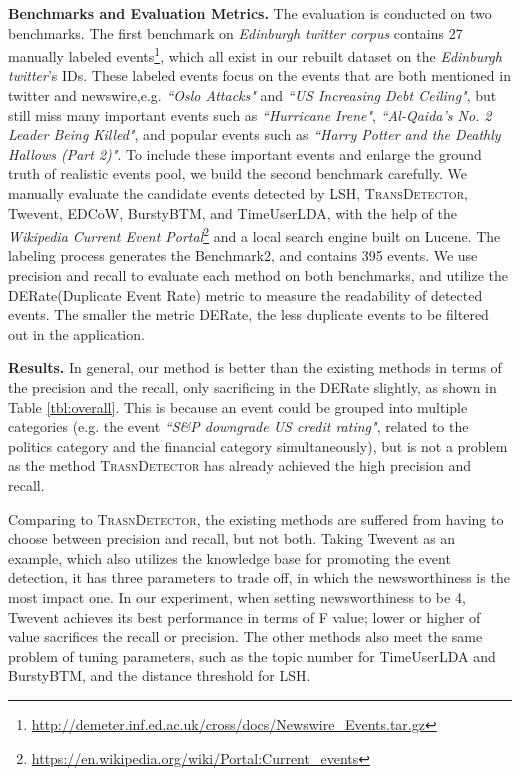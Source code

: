 \documentclass[runningheads,a4paper]{llncs}
\theoremstyle{exampstyle}
\begin{document}
\textbf{Benchmarks and Evaluation Metrics.} 
The evaluation is conducted on two benchmarks.
The first benchmark on \textit{Edinburgh twitter corpus} contains 27 manually labeled events\cite{petrovic2013can}\footnote{\url{http://demeter.inf.ed.ac.uk/cross/docs/Newswire_Events.tar.gz}}, which all exist in our rebuilt dataset on the \textit{Edinburgh twitter}'s IDs.
These labeled events focus on the events that are both mentioned in twitter and newswire,e.g. \textit{``Oslo Attacks"} and \textit{``US Increasing Debt Ceiling"}, but still miss many important events such as \textit{``Hurricane Irene"}, \textit{``Al-Qaida's No. 2 Leader Being Killed"}, and popular events such as \textit{``Harry Potter and the Deathly Hallows (Part 2)"}.
To include these important events and enlarge the ground truth of realistic events pool, we build the second benchmark carefully.
We manually evaluate the candidate events detected by LSH,  \textsc{TransDetector}, Twevent, EDCoW, BurstyBTM, and TimeUserLDA, with the help of the \textit{Wikipedia Current Event Portal}\footnote{\url{https://en.wikipedia.org/wiki/Portal:Current_events}} and a local search engine built on Lucene.
The labeling process generates the Benchmark2, and contains 395 events.
We use precision and recall to evaluate each method on both benchmarks, and utilize the DERate(Duplicate Event Rate) metric\cite{Twevent2012} to measure the readability of detected events.
The smaller the metric DERate, the less duplicate events to be filtered out in the application.


\textbf{Results.}
In general, our method is better than the existing methods in terms of the precision and the recall, only sacrificing in the DERate slightly, as shown in Table \ref{tbl:overall}. 
This is because an event could be grouped into multiple categories (e.g. the event \textit{``S\&P downgrade US credit rating"}, related to the politics category and the financial category simultaneously), but is not a problem as the method \textsc{TrasnDetector} has already achieved the high precision and recall. 

Comparing to \textsc{TrasnDetector}, the existing methods are suffered from having to choose between precision and recall, but not both. 
Taking Twevent as an example, which also utilizes the knowledge base for promoting the event detection, it has three parameters to trade off, in which the newsworthiness is the most impact one. 
In our experiment, when setting newsworthiness to be 4, Twevent achieves its best performance in terms of F value; lower or higher of value sacrifices the recall or precision. 
The other methods also meet the same problem of tuning parameters, such as the topic number for TimeUserLDA and BurstyBTM, and the distance threshold for LSH.
\end{document}
